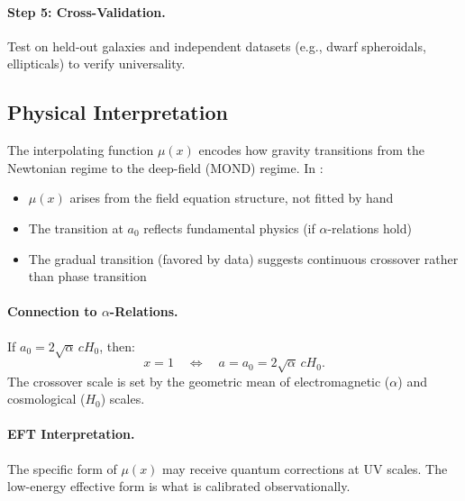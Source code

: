 \paragraph{Step 5: Cross-Validation.}
Test on held-out galaxies and independent datasets (e.g., dwarf spheroidals, 
ellipticals) to verify universality.

\subsection{Physical Interpretation}\label{app:mu_physics}

The interpolating function $\mu(x)$ encodes how gravity transitions from 
the Newtonian regime to the deep-field (MOND) regime. In \DFD:

\begin{itemize}
\item $\mu(x)$ arises from the field equation structure, not fitted by hand
\item The transition at $a_0$ reflects fundamental physics (if $\alpha$-relations hold)
\item The gradual transition (favored by data) suggests continuous crossover rather than phase transition
\end{itemize}

\paragraph{Connection to $\alpha$-Relations.}
If $a_0 = 2\sqrt{\alpha}\,cH_0$, then:
\begin{equation}
x = 1 \quad \Leftrightarrow \quad a = a_0 = 2\sqrt{\alpha}\,cH_0.
\end{equation}
The crossover scale is set by the geometric mean of electromagnetic 
($\alpha$) and cosmological ($H_0$) scales.

\paragraph{EFT Interpretation.}
The specific form of $\mu(x)$ may receive quantum corrections at UV scales. 
The low-energy effective form is what is calibrated observationally.
